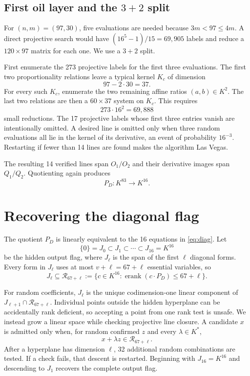 \documentclass[11pt]{article}
\newcommand{\essrank}{\operatorname{erank}}
\newcommand{\defeq}{\mathrel{:=}}
\begin{document}
\subsection{First oil layer and the \texorpdfstring{$3+2$}{3+2} split}

For $(n,m)=(97,30)$, five evaluations are needed because
$3m<97\leq4m$.  A direct projective search would have
$(16^5-1)/15=69{,}905$ labels and reduce a $120\times97$ matrix for each one.
We use a $3+2$ split.

First enumerate the 273 projective labels for the first three evaluations.
The first two proportionality relations leave a typical kernel $K_c$ of
dimension
\[
       97-2\cdot30=37.
\]
For every such $K_c$, enumerate the two remaining affine ratios
$(a,b)\in K^2$.  The last two relations are then a $60\times37$ system on
$K_c$.  This requires
\[
       273\cdot16^2=69{,}888
\]
small reductions.  The 17 projective labels whose first three entries vanish
are intentionally omitted.  A desired line is omitted only when three random
evaluations all lie in the kernel of its derivative, an event of probability
$16^{-3}$.  Restarting if fewer than 14 lines are found makes the algorithm
Las Vegas.

The resulting 14 verified lines span $O_1/O_2$ and their derivative images
span $Q_1/Q_2$.  Quotienting again produces
\[
       P_D:K^{83}\longrightarrow K^{16}.
\]

\section{Recovering the diagonal flag}

The quotient $P_D$ is linearly equivalent to the 16 equations in
\eqref{eq:diag}.  Let
\[
       \{0\}=J_0\subset J_1\subset\cdots\subset J_{16}=K^{16}
\]
be the hidden output flag, where $J_\ell$ is the span of the first $\ell$
diagonal forms.  Every form in $J_\ell$ uses at most $v+\ell=67+\ell$
essential variables, so
\begin{equation}
       J_\ell\subseteq
       \mathcal R_{67+\ell}
       \defeq\{c\in K^{16}:\essrank(c\cdot P_D)\leq67+\ell\}.
                                                               \label{eq:rankvar}
\end{equation}

For random coefficients, $J_\ell$ is the unique codimension-one linear
component of
$J_{\ell+1}\cap\mathcal R_{67+\ell}$.  Individual points outside the hidden
hyperplane can be accidentally rank deficient, so accepting a point from one
rank test is unsafe.  We instead grow a linear space while checking projective
line closure.  A candidate $x$ is admitted only when, for random confirmed
$z$ and every $\lambda\in K^*$,
\[
          x+\lambda z\in\mathcal R_{67+\ell}.
\]
After a hyperplane has dimension $\ell$, 32 additional random combinations
are tested.  If a check fails, that descent is restarted.  Beginning with
$J_{16}=K^{16}$ and descending to $J_1$ recovers the complete output flag.
\end{document}
